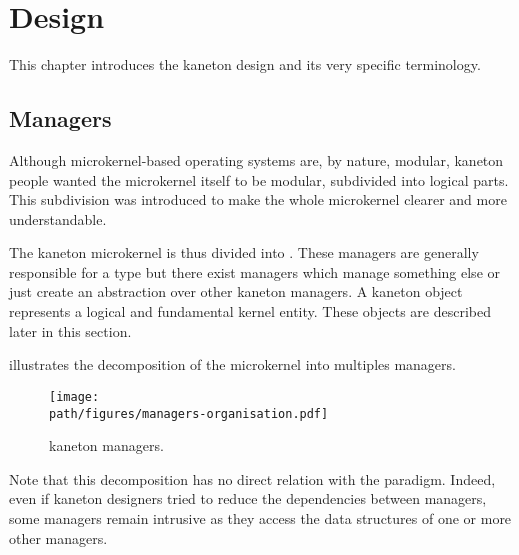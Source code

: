 %
%
%
%
%
%

%
%

\chapter{Design}
\label{chapter:design}

This chapter introduces the kaneton design and its very specific terminology.

\newpage

%
%

%
%

\section{Managers}

Although microkernel-based operating systems are, by nature, modular, kaneton
people wanted the microkernel itself to be modular, subdivided into logical
parts. This subdivision was introduced to make the whole microkernel clearer
and more understandable.

The kaneton microkernel is thus divided into . These
managers are generally responsible for a  type but there
exist managers which manage something else or just create an abstraction over
other kaneton managers. A kaneton object represents a logical and fundamental
kernel entity. These objects are described later in this section.

 illustrates the
decomposition of the microkernel into multiples managers.

\begin{figure}[h]
  \begin{center}
    \texttt{[image: \\path/figures/managers-organisation.pdf]}
    \caption{kaneton managers.}
    \label{figure:managers-organisation}
  \end{center}
\end{figure}

Note that this decomposition has no direct relation with the
 paradigm. Indeed, even if kaneton
designers tried to reduce the dependencies between managers, some managers
remain intrusive as they access the data structures of one or more other
managers.

